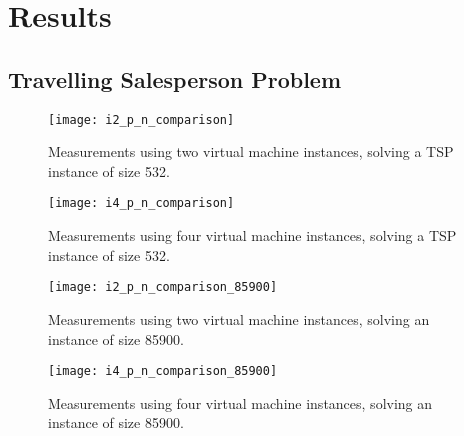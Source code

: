 \section{Results} \label{sec:results}


\subsection{Travelling Salesperson Problem}


\begin{figure}[htpb]
    \centering
    \begin{minipage}{.45\textwidth}
        \centering
        \texttt{[image: i2\_p\_n\_comparison]}
        \caption{Measurements using two virtual machine instances, solving
                 a TSP instance of size 532.}
        \label{fig:532tspi2}
    \end{minipage}%
    \hfill
    \begin{minipage}{.45\textwidth}
        \centering
        \texttt{[image: i4\_p\_n\_comparison]}
        \caption{Measurements using four virtual machine instances,
                 solving a TSP instance of size 532.}
        \label{fig:532tspi4}
    \end{minipage}%
    \label{fig:532tsp}
\end{figure}

\begin{figure}[htpb]
    \centering
    \begin{minipage}{.45\textwidth}
        \centering
        \texttt{[image: i2\_p\_n\_comparison\_85900]}
        \caption{Measurements using two virtual machine instances,
                 solving an instance of size 85900.}
        \label{fig:85900tspi2}
    \end{minipage}%
    \hfill
    \begin{minipage}{.45\textwidth}
        \centering
        \texttt{[image: i4\_p\_n\_comparison\_85900]}
        \caption{Measurements using four virtual machine instances,
                 solving an instance of size 85900.}
        \label{fig:85900tspi4}
    \end{minipage}%
    \label{fig:85900tsp}
\end{figure}

